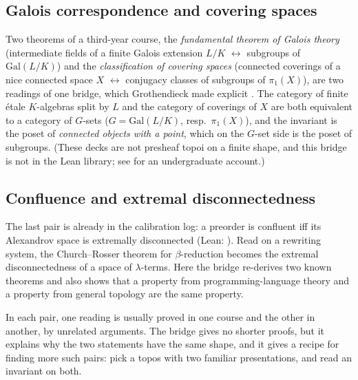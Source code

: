 \subsection{Galois correspondence and covering spaces}

Two theorems of a third-year course, the \emph{fundamental theorem of Galois theory} (intermediate fields of a finite Galois extension $L/K$ $\leftrightarrow$ subgroups of $\mathrm{Gal}(L/K)$) and the \emph{classification of covering spaces} (connected coverings of a nice connected space $X$ $\leftrightarrow$ conjugacy classes of subgroups of $\pi_1(X)$), are two readings of one bridge, which Grothendieck made explicit \cite{sga1}. The category of finite étale $K$-algebras split by $L$ and the category of coverings of $X$ are both equivalent to a category of $G$-sets ($G = \mathrm{Gal}(L/K)$, resp.\ $\pi_1(X)$), and the invariant is the poset of \emph{connected objects with a point}, which on the $G$-set side is the poset of subgroups. (These decks are not presheaf topoi on a finite shape, and this bridge is not in the Lean library; see \cite{szamuely} for an undergraduate account.)

\subsection{Confluence and extremal disconnectedness}

The last pair is already in the calibration log: a preorder is confluent iff its Alexandrov space is extremally disconnected \cite[Prop.~7.10]{caramello-stone} (Lean: ). Read on a rewriting system, the Church--Rosser theorem for $\beta$-reduction becomes the extremal disconnectedness of a space of $\lambda$-terms. Here the bridge re-derives two known theorems and also shows that a property from programming-language theory and a property from general topology are the same property.

\begin{remark}
In each pair, one reading is usually proved in one course and the other in another, by unrelated arguments. The bridge gives no shorter proofs, but it explains why the two statements have the same shape, and it gives a recipe for finding more such pairs: pick a topos with two familiar presentations, and read an invariant on both.
\end{remark}
